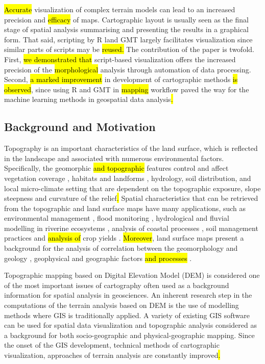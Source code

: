 \documentclass[land,article,submit,pdftex,moreauthors]{Definitions/mdpi}
\begin{document}
\hl{Accurate} visualization of complex terrain models can lead to an increased precision and \hl{efficacy} of maps. Cartographic layout is usually seen as the final stage of spatial analysis summarising and presenting the results in a graphical form. That said, scripting by R land GMT largely facilitates\hl{ }visualization\hl{ }since similar parts of scripts may be \hl{reused.} The contribution of the paper is twofold. First, \hl{we demonstrated that }script-based\hl{ }visualization offers the increased precision of the \hl{morphological} analysis through automation of data processing. Second, \hl{a marked improvement} in development of cartographic methods \hl{is observed}, since using R and GMT in \hl{mapping} workflow paved the way for the machine learning methods in geospatial data analysis\hl{.}

\subsection{Background and Motivation}
Topography is an important characteristics of the land surface, which is reflected in the landscape and associated with numerous environmental factors. Specifically, the geomorphic \hl{and topographic }features control and affect vegetation coverage \cite{land10060559,GOMEZ201511}, habitats and landforms \cite{land7030102,land10101031}, hydrology, soil distribution, and local micro-climate setting that are dependent on the topographic exposure, slope steepness and curvature of the relief\hl{. }Spatial characteristics that can be retrieved from the topographic and land surface maps have many applications, such as environmental management  \cite{land6040083}, flood monitoring \cite{HOOKE2020106793}, hydrological and fluvial modelling in riverine ecosystems \cite{SIAKEU2004231,NAKAYAMA201362}, analysis of coastal processes \cite{ITO2022102527}, soil management practices and \hl{analysis of }crop yields \cite{TABUCHI20174,PRIYA2001113,SASAI2012175}. \hl{Moreover}, land surface maps present a\hl{ }background for the analysis of correlation between the geomorphology and geology \cite{MATSUURA20141}, geophysical and geographic factors \hl{and processes} \cite{IMAIZUMI2018125}. 

Topographic mapping based on Digital Elevation Model (DEM) is considered one of the most important issues of cartography often used as a background information for spatial analysis in geosciences. An inherent research step in the computations of the terrain analysis based on DEM is the use of modelling methods where GIS is traditionally applied. A variety of existing GIS software can be used for spatial data visualization and topographic analysis considered as a background for both socio-geographic and physical-geographic mapping. Since the onset of the GIS development, technical methods of cartographic visualization, approaches of terrain analysis are constantly improved\hl{.}
\end{document}
